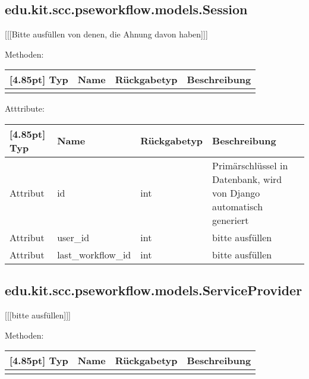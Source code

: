 		
		\subsection{edu.kit.scc.pseworkflow.models.Session}
			[[[Bitte ausfüllen von denen, die Ahnung davon haben]]]
			
			Methoden:
			\begin{center}
				\setlength\tabcolsep{5pt}
				\renewcommand{\arraystretch}{1.5}
				
				\begin{tabularx}{\textwidth}{|l|l|l|X|}
					\hline
					\rowcolor[gray]{0.75}[4.85pt]
					Typ & Name & Rückgabetyp & Beschreibung \\ \hline 
					&&& \\
					\hline
				\end{tabularx}
			\end{center}
			
			Atttribute:
			\begin{center}
				\setlength\tabcolsep{5pt}
				\renewcommand{\arraystretch}{1.5}
				
				\begin{tabularx}{\textwidth}{|l|l|l|X|}
					\hline
					\rowcolor[gray]{0.75}[4.85pt]
					Typ & Name & Rückgabetyp & Beschreibung \\ \hline 
					Attribut & id & int & Primärschlüssel in Datenbank, wird von Django automatisch generiert \\ \hline
					Attribut & user\_id & int & bitte ausfüllen \\ \hline
					Attribut & last\_workflow\_id & int & bitte ausfüllen \\
					\hline
				\end{tabularx}
			\end{center}
		
		\subsection{edu.kit.scc.pseworkflow.models.ServiceProvider}
			[[[bitte ausfüllen]]]
			
			Methoden:
			\begin{center}
				\setlength\tabcolsep{5pt}
				\renewcommand{\arraystretch}{1.5}
				
				\begin{tabularx}{\textwidth}{|l|l|l|X|}
					\hline
					\rowcolor[gray]{0.75}[4.85pt]
					Typ & Name & Rückgabetyp & Beschreibung \\ \hline 
					&&& \\
					\hline
				\end{tabularx}
			\end{center}
			
